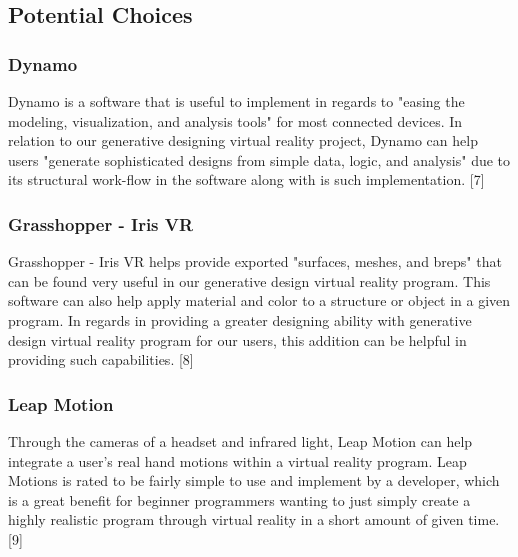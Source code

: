 \documentclass[letterpaper,10pt,onecolumn,compsoc]{IEEEtran}
\begin{document}
\subsection{Potential Choices}
\subsubsection{Dynamo}


\noindent
Dynamo is a software that is useful to implement in regards to "easing the modeling, visualization, and analysis tools" for most connected devices. In relation to our generative designing virtual reality project, Dynamo can help users "generate sophisticated designs from simple data, logic, and analysis" due to its structural work-flow in the software along with is such implementation. [7]

\subsubsection{Grasshopper - Iris VR}


\noindent
Grasshopper - Iris VR helps provide exported "surfaces, meshes, and breps" that can be found very useful in our generative design virtual reality program. This software can also help apply material and color to a structure or object in a given program. In regards in providing a greater designing ability with generative design virtual reality program for our users, this addition can be helpful in providing such capabilities. [8] 

\subsubsection{Leap Motion}


\noindent
Through the cameras of a headset and infrared light, Leap Motion can help integrate a user's real hand motions within a virtual reality program. Leap Motions is rated to be fairly simple to use and implement by a developer, which is a great benefit for beginner programmers wanting to just simply create a highly realistic program through virtual reality in a short amount of given time. [9]
\end{document}
